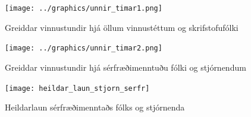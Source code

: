 \documentclass[12pt, git, final]{rureport}
\begin{document}
\begin{figure}
	\centering 
	\texttt{[image: ../graphics/unnir\_timar1.png]}
	\caption{Greiddar vinnustundir hjá öllum vinnustéttum og skrifstofufólki \label{fig:unnirtimar1}}
\end{figure}

\begin{figure}
	\centering 
	\texttt{[image: ../graphics/unnir\_timar2.png]}
	\caption{Greiddar vinnustundir hjá sérfræðimenntuðu fólki og stjórnendum \label{fig:unnirtimar2}}
\end{figure}

\begin{figure}
	\centering
	\texttt{[image: heildar\_laun\_stjorn\_serfr]}
	\caption{Heildarlaun sérfræðimenntaðs fólks og stjórnenda}
	\label{fig:heildarlaunstjorn}
\end{figure}

%
\clearpage
\printbibliography
\end{document}
